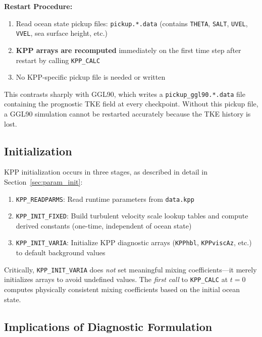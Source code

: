 \documentclass[12pt,letterpaper]{article}
\begin{document}
\begin{infobox}
\textbf{Restart Procedure:}
\begin{enumerate}[leftmargin=*]
  \item Read ocean state pickup files: \texttt{pickup.*.data}
        (contains \texttt{THETA}, \texttt{SALT}, \texttt{UVEL}, \texttt{VVEL},
        sea surface height, etc.)
  \item \textbf{KPP arrays are recomputed} immediately on the first time step
        after restart by calling \texttt{KPP\_CALC}
  \item No KPP-specific pickup file is needed or written
\end{enumerate}
\end{infobox}

This contrasts sharply with GGL90, which writes a \texttt{pickup\_ggl90.*.data}
file containing the prognostic TKE field at every checkpoint. Without this pickup
file, a GGL90 simulation cannot be restarted accurately because the TKE history
is lost.

\subsection{Initialization}

KPP initialization occurs in three stages, as described in detail in
Section~\ref{sec:param_init}:

\begin{enumerate}[leftmargin=*]
  \item \texttt{KPP\_READPARMS}: Read runtime parameters from \texttt{data.kpp}
  \item \texttt{KPP\_INIT\_FIXED}: Build turbulent velocity scale lookup tables
        and compute derived constants (one-time, independent of ocean state)
  \item \texttt{KPP\_INIT\_VARIA}: Initialize KPP diagnostic arrays
        (\texttt{KPPhbl}, \texttt{KPPviscAz}, etc.) to default background values
\end{enumerate}

Critically, \texttt{KPP\_INIT\_VARIA} does \textit{not} set meaningful mixing
coefficients---it merely initializes arrays to avoid undefined values. The
\textit{first call} to \texttt{KPP\_CALC} at $t = 0$ computes physically
consistent mixing coefficients based on the initial ocean state.

\subsection{Implications of Diagnostic Formulation}
\end{document}
